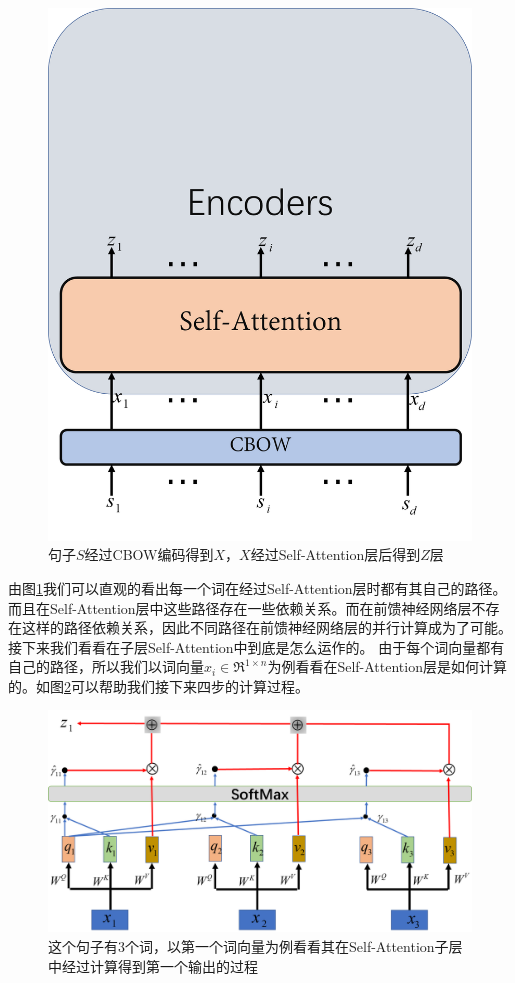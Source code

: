 \documentclass[]{article}
\begin{document}
\begin{figure}[htbp]
	\centering
	\includegraphics[width=0.6\linewidth]{figures/006}
	\caption{句子$ S $经过CBOW编码得到$ X $，$ X $经过Self-Attention层后得到$ Z $层}
	\label{fig:006}
\end{figure}
由图\ref{fig:006}我们可以直观的看出每一个词在经过Self-Attention层时都有其自己的路径。而且在Self-Attention层中这些路径存在一些依赖关系。而在前馈神经网络层不存在这样的路径依赖关系，因此不同路径在前馈神经网络层的并行计算成为了可能。接下来我们看看在子层Self-Attention中到底是怎么运作的。
由于每个词向量都有自己的路径，所以我们以词向量$ {x_i} \in {\Re ^{1 \times n}} $为例看看在Self-Attention层是如何计算的。如图\ref{fig:007}可以帮助我们接下来四步的计算过程。
\begin{figure}[htbp]
	\centering
	\includegraphics[width=0.6\linewidth]{figures/007}
	\caption{这个句子有3个词，以第一个词向量为例看看其在Self-Attention子层中经过计算得到第一个输出的过程}
	\label{fig:007}
\end{figure}
\end{document}
